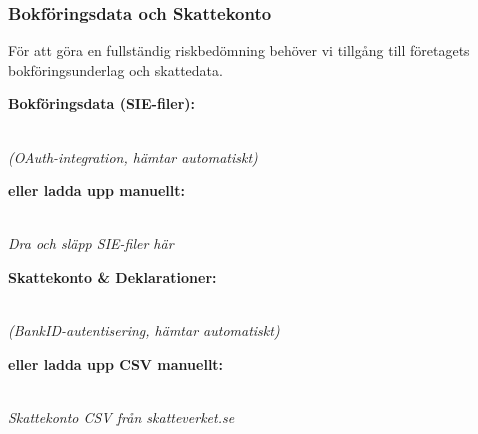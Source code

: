 \documentclass[10pt]{beamer}
\begin{document}
\begin{frame}[label=bokforing_bank]
  \frametitle{Bokföringsdata och Skattekonto}
  \small
  För att göra en fullständig riskbedömning behöver vi tillgång till företagets bokföringsunderlag och skattedata.
  
  \vspace{0.3cm}
  \begin{minipage}{0.48\textwidth}
    \textbf{Bokföringsdata (SIE-filer):}\\
    \vspace{0.2cm}
    
     \quad
     \quad
    \\
    \footnotesize\textit{(OAuth-integration, hämtar automatiskt)}
    
    \vspace{0.2cm}
    \textbf{eller ladda upp manuellt:}\\
    \vspace{0.2cm}
    
    \fbox{\rule{4.5cm}{1.2cm}}\\
    \footnotesize\textit{Dra och släpp SIE-filer här}
    
  \end{minipage}
  \hfill
  \begin{minipage}{0.48\textwidth}
    \textbf{Skattekonto \& Deklarationer:}\\
    \vspace{0.2cm}
    
    \\
    \footnotesize\textit{(BankID-autentisering, hämtar automatiskt)}
    
    \vspace{0.2cm}
    \textbf{eller ladda upp CSV manuellt:}\\
    \vspace{0.2cm}
    
    \fbox{\rule{4.5cm}{1.2cm}}\\
    \footnotesize\textit{Skattekonto CSV från skatteverket.se}
  \end{minipage}
  

\end{frame}
\end{document}
